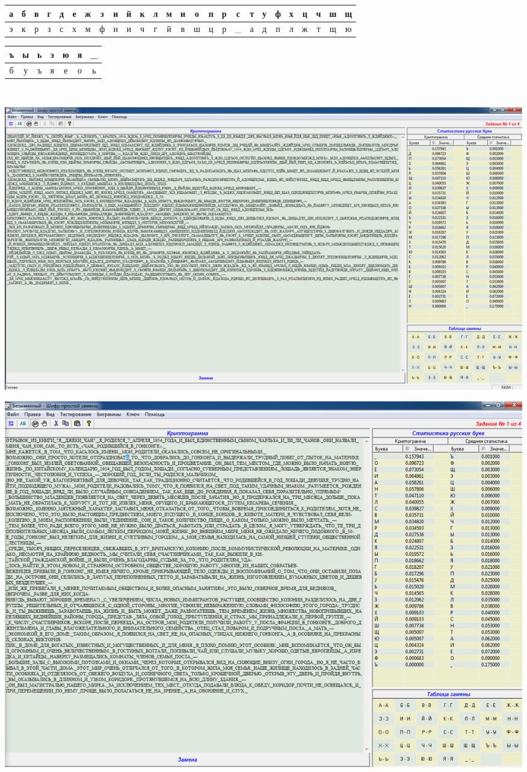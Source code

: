 \documentclass[a4paper,14pt]{extarticle}
\begin{document}
    \vspace{-3em}
    \begin{center}
        \begin{tabular}{|c|c|c|c|c|c|c|c|c|c|c|c|c|c|c|c|c|c|c|c|c|c|c|c|c|c|}
            \hline
            а & б & в & г & д & е & ж & з & и & й & к & л & м & н & о & п & р & с & т & у & ф & х & ц & ч & ш & щ  \\
            \hline
            э & к & р & з & с & х & м & ф & н & и & ч & г & й & в & ш & ц & р &\_ & а & д & п & л & ж & т & щ & ю   \\
            \hline
        \end{tabular}
    \end{center}
    \begin{tabular}{|c|c|c|c|c|c|c|}
        \hline
        ъ & ы & ь & э & ю & я & \_ \\
        \hline
        б & у & ъ & я & е & о & ь \\
        \hline
    \end{tabular}\\
    \begin{center}
        \includegraphics[scale=0.3]{pics/2.png}
    \end{center}
    \begin{center}
        \includegraphics[scale=0.3]{pics/2_1.png}
    \end{center}
\end{document}

